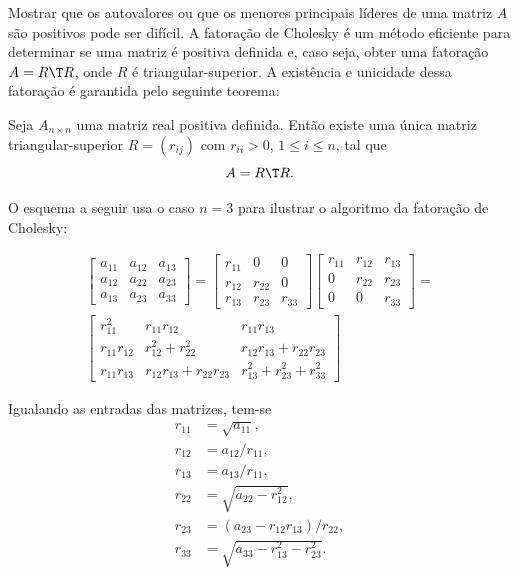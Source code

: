 \documentclass{article}
\begin{document}
Mostrar que os autovalores ou que os menores principais líderes de uma matriz \(A\) são positivos pode ser difícil. A fatoração de Cholesky é um método eficiente para determinar se uma matriz é positiva definida e, caso seja, obter uma fatoração \(A = R\T  R\), onde \(R\) é triangular-superior. A existência e unicidade dessa fatoração é garantida pelo seguinte teorema:

\begin{thm}
    Seja \(A_{n \times n}\) uma matriz real positiva definida. Então existe uma única matriz triangular-superior \(R = (r_{ij})\) com \(r_{ii} > 0\), \(1 \leq i \leq n\), tal que
    \[
        A = R\T  R.
    \]
\end{thm}

O esquema a seguir usa o caso \(n=3\) para ilustrar o algoritmo da fatoração de Cholesky:

\begin{tcolorbox}[title=Computando a fatoração de Cholesky]
    \begin{multline}
        \begin{bmatrix}
            a_{11} & a_{12} & a_{13} \\
            a_{12} & a_{22} & a_{23} \\
            a_{13} & a_{23} & a_{33}
        \end{bmatrix} = 
        \begin{bmatrix}
            r_{11} & 0 & 0 \\
            r_{12} & r_{22} & 0 \\
            r_{13} & r_{23} & r_{33}
        \end{bmatrix}
        \begin{bmatrix}
            r_{11} & r_{12} & r_{13} \\
            0 & r_{22} & r_{23} \\
            0 & 0 & r_{33}
        \end{bmatrix} = \\
        \begin{bmatrix}
            r_{11}^2 & r_{11}r_{12} & r_{11}r_{13} \\
            r_{11}r_{12} & r_{12}^2 + r_{22}^2 & r_{12}r_{13} + r_{22}r_{23} \\
            r_{11}r_{13} & r_{12}r_{13} + r_{22}r_{23} & r_{13}^2 + r_{23}^2 + r_{33}^2
        \end{bmatrix}   
    \end{multline}

    Igualando as entradas das matrizes, tem-se
    \begin{align*}
        r_{11} &= \sqrt{a_{11}}, \\
        r_{12} &= a_{12}/r_{11}, \\
        r_{13} &= a_{13}/r_{11}, \\
        r_{22} &= \sqrt{a_{22} - r_{12}^2}, \\
        r_{23} &= (a_{23} - r_{12}r_{13})/r_{22}, \\
        r_{33} &= \sqrt{a_{33} - r_{13}^2 - r_{23}^2}.
    \end{align*}
\end{tcolorbox}
\end{document}
